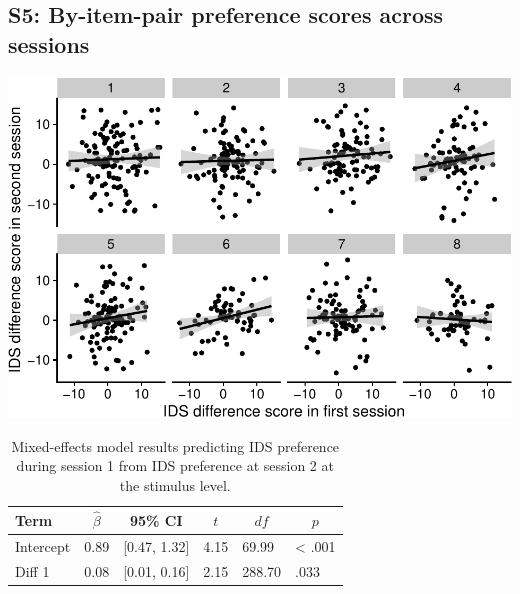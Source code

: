 \documentclass[
  man, donotrepeattitle,floatsintext]{apa6}
\begin{document}
\hypertarget{s5-by-item-pair-preference-scores-across-sessions}{%
\subsection{S5: By-item-pair preference scores across sessions}\label{s5-by-item-pair-preference-scores-across-sessions}}

\includegraphics{MB1T_supplement_files/figure-latex/unnamed-chunk-8-1.pdf}

\begin{table}[tbp]

\begin{center}
\begin{threeparttable}

\caption{\label{tab:unnamed-chunk-8}Mixed-effects model results predicting IDS preference during session 1 from IDS preference at session 2 at the stimulus level.}

\begin{tabular}{llllll}
\toprule
Term & \multicolumn{1}{c}{$\hat{\beta}$} & \multicolumn{1}{c}{95\% CI} & \multicolumn{1}{c}{$t$} & \multicolumn{1}{c}{$\mathit{df}$} & \multicolumn{1}{c}{$p$}\\
\midrule
Intercept & 0.89 & {}[0.47, 1.32] & 4.15 & 69.99 & < .001\\
Diff 1 & 0.08 & {}[0.01, 0.16] & 2.15 & 288.70 & .033\\
\bottomrule
\end{tabular}

\end{threeparttable}
\end{center}

\end{table}
\end{document}
